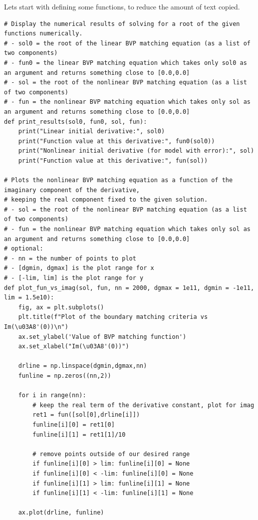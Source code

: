 \documentclass{article}
\begin{document}
Lets start with defining some functions, to reduce the amount of text copied.

\begin{lstlisting}
# Display the numerical results of solving for a root of the given functions numerically.
# - sol0 = the root of the linear BVP matching equation (as a list of two components)
# - fun0 = the linear BVP matching equation which takes only sol0 as an argument and returns something close to [0.0,0.0]
# - sol = the root of the nonlinear BVP matching equation (as a list of two components)
# - fun = the nonlinear BVP matching equation which takes only sol as an argument and returns something close to [0.0,0.0]
def print_results(sol0, fun0, sol, fun):
    print("Linear initial derivative:", sol0)
    print("Function value at this derivative:", fun0(sol0))
    print("Nonlinear initial derivative (for model with error):", sol)
    print("Function value at this derivative:", fun(sol))

# Plots the nonlinear BVP matching equation as a function of the imaginary component of the derivative,
# keeping the real component fixed to the given solution.
# - sol = the root of the nonlinear BVP matching equation (as a list of two components)
# - fun = the nonlinear BVP matching equation which takes only sol as an argument and returns something close to [0.0,0.0]
# optional:
# - nn = the number of points to plot
# - [dgmin, dgmax] is the plot range for x
# - [-lim, lim] is the plot range for y
def plot_fun_vs_imag(sol, fun, nn = 2000, dgmax = 1e11, dgmin = -1e11, lim = 1.5e10):
    fig, ax = plt.subplots()
    plt.title(f"Plot of the boundary matching criteria vs Im(\u03A8'(0))\n")
    ax.set_ylabel('Value of BVP matching function')
    ax.set_xlabel("Im(\u03A8'(0))")
    
    drline = np.linspace(dgmin,dgmax,nn)
    funline = np.zeros((nn,2))

    for i in range(nn):
        # keep the real term of the derivative constant, plot for imag
        ret1 = fun([sol[0],drline[i]])
        funline[i][0] = ret1[0]
        funline[i][1] = ret1[1]/10

        # remove points outside of our desired range
        if funline[i][0] > lim: funline[i][0] = None
        if funline[i][0] < -lim: funline[i][0] = None
        if funline[i][1] > lim: funline[i][1] = None
        if funline[i][1] < -lim: funline[i][1] = None

    ax.plot(drline, funline)


\end{lstlisting}
\end{document}
